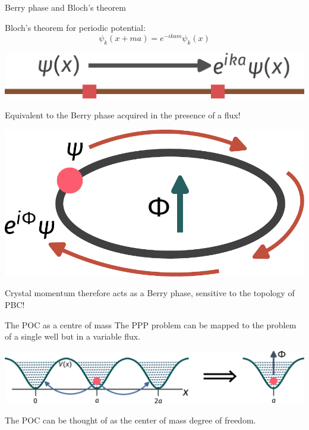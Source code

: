 \documentclass[aspectratio=169]{beamer}
\begin{document}
\begin{frame}{Berry phase and Bloch’s theorem}
\begin{minipage}{0.5\textwidth}
Bloch's theorem for periodic potential:
\[\psi_k(x + ma) = e^{-ikam}\psi_k(x)\]
\end{minipage}
\hspace*{\fill}
\begin{minipage}{0.45\textwidth}
\includegraphics[width=\textwidth]{blochtheorem.pdf}
\end{minipage}

\vspace*{\fill}
\begin{minipage}{0.5\textwidth}
Equivalent to the \alert{Berry phase} acquired in the presence of a flux!\\[10pt]
\end{minipage}
\hspace*{\fill}
\begin{minipage}{0.45\textwidth}
\includegraphics[width=\textwidth]{berryphase.pdf}
\end{minipage}

\vspace*{\fill}
Crystal momentum therefore acts as a Berry phase, sensitive to the \alert{topology of PBC}!
\end{frame}

\begin{frame}{The POC as a centre of mass}
The PPP problem can be mapped to the problem \\
of a single well but in a variable flux.

\vspace*{\fill}
\includegraphics[width=\textwidth]{centerofmass.pdf}

\vspace*{\fill}
The POC can be thought of as the \alert{center of mass} degree of freedom.
\end{frame}
\end{document}
